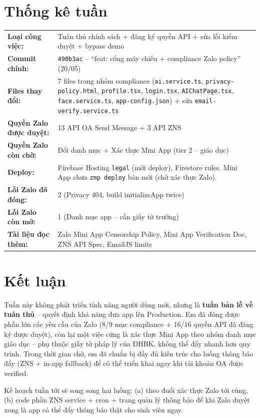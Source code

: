\documentclass{article}
\begin{document}
\section{Thống kê tuần}

\begin{tabularx}{\textwidth}{@{}l X@{}}
\textbf{Loại công việc:} & Tuân thủ chính sách + đăng ký quyền API + sửa lỗi kiểm duyệt + bypass demo \\
\textbf{Commit chính:} & \texttt{490b3ac} -- ``feat: cổng máy chiếu + compliance Zalo policy'' (20/05) \\
\textbf{Files thay đổi:} & 7 files trong nhóm compliance (\texttt{ai.service.ts}, \texttt{privacy-policy.html}, \texttt{profile.tsx}, \texttt{login.tsx}, \texttt{AIChatPage.tsx}, \texttt{face.service.ts}, \texttt{app-config.json}) + sửa \texttt{email-verify.service.ts} \\
\textbf{Quyền Zalo được duyệt:} & 13 API OA Send Message + 3 API ZNS \\
\textbf{Quyền Zalo còn chờ:} & Đổi danh mục + Xác thực Mini App (tier 2 -- giáo dục) \\
\textbf{Deploy:} & Firebase Hosting \texttt{legal} (mới deploy), Firestore rules. Mini App chưa \texttt{zmp deploy} bản mới (chờ xác thực Zalo). \\
\textbf{Lỗi Zalo đã đóng:} & 2 (Privacy 404, build initializeApp twice) \\
\textbf{Lỗi Zalo còn mở:} & 1 (Danh mục app -- cần giấy tờ trường) \\
\textbf{Tài liệu đọc thêm:} & Zalo Mini App Censorship Policy, Mini App Verification Doc, ZNS API Spec, EmailJS limits \\
\end{tabularx}

\section{Kết luận}

Tuần này không phát triển tính năng người dùng mới, nhưng là \textbf{tuần bản lề về tuân thủ} -- quyết định khả năng đưa app lên Production. Em đã đóng được phần lớn các yêu cầu của Zalo (8/9 mục compliance + 16/16 quyền API đã đăng ký được duyệt), còn lại một việc cứng là xác thực Mini App theo nhóm danh mục giáo dục -- phụ thuộc giấy tờ pháp lý của ĐHBK, không thể đẩy nhanh hơn quy trình. Trong thời gian chờ, em đã chuẩn bị đầy đủ kiến trúc cho luồng thông báo đẩy (ZNS + in-app fallback) để có thể triển khai ngay khi tài khoản OA được verified.

Kế hoạch tuần tới sẽ song song hai luồng: (a) theo đuổi xác thực Zalo tới cùng, (b) code phần ZNS service + cron + trang quản lý thông báo để khi Zalo duyệt xong là app có thể đẩy thông báo thật cho sinh viên ngay.
\end{document}
